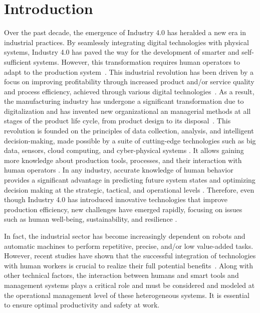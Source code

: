 \documentclass[review,12pt, 3p, times]{elsarticle}
\begin{document}
\newpage

\section{Introduction}
Over the past decade, the emergence of Industry 4.0 has heralded a new era in industrial practices. By seamlessly integrating digital technologies with physical systems, Industry 4.0 has paved the way for the development of smarter and self-sufficient systems. However, this transformation requires human operators to adapt to the production system~\cite{lyngstadaas2022harder,fantini2020placing,pinzone2020framework}. This industrial revolution has been driven by a focus on improving profitability through increased product and/or service quality and process efficiency, achieved through various digital technologies~\cite{raja2023industry}. As a result, the manufacturing industry has undergone a significant transformation due to digitalization and has invented new organizational an managerial methods at all stages of the product life cycle, from product design to its disposal~\citep{messaadia2016plm}. This revolution is founded on the principles of data collection, analysis, and intelligent decision-making, made possible by a suite of cutting-edge technologies such as big data, sensors, cloud computing, and cyber-physical systems \citep{brik2022fog}. It allows gaining more knowledge about production tools, processes, and their interaction with human operators \cite{kadir2020human}. In any industry, accurate knowledge of human behavior provides a significant advantage in predicting future system states and optimizing decision making at the strategic, tactical, and operational levels \citep{bailly2020}. Therefore, even though Industry 4.0 has introduced innovative technologies that improve production efficiency, new challenges have emerged rapidly, focusing on issues such as human well-being, sustainability, and resilience \citep{lyngstadaas2022harder}.
 
In fact, the industrial sector has become increasingly dependent on robots and automatic machines to perform repetitive, precise, and/or low value-added tasks. However, recent studies have shown that the successful integration of technologies with human workers is crucial to realize their full potential benefits~\citep{chen2022analysis,kose2023game,dolgui2022design}. Along with other technical factors, the interaction between humans and smart tools and management systems plays a critical role and must be considered and modeled at the operational management level of these heterogeneous systems. It is essential to ensure optimal productivity and safety at work. 
\end{document}
